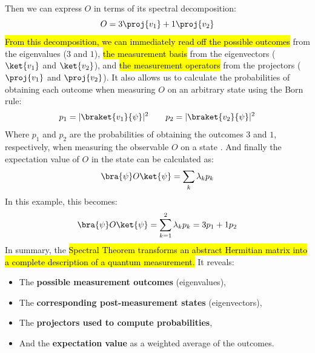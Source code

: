 Then we can express $O$ in terms of its spectral decomposition:
\begin{equation*}
    O = 3 \proj{v_1} + 1 \proj{v_2}
\end{equation*}
\hl{From this decomposition, we can immediately read off the possible outcomes} from the eigenvalues ($3$ and $1$), \hl{the measurement basis} from the eigenvectors ($\ket{v_1}$ and $\ket{v_2}$), and \hl{the measurement operators} from the projectors ($\proj{v_1}$ and $\proj{v_2}$). It also allows us to calculate the probabilities of obtaining each outcome when measuring $O$ on an arbitrary state \ket{\psi} using the Born rule:
\begin{equation*}
    p_1 = |\braket{v_1}{\psi}|^2
    \qquad
    p_2 = |\braket{v_2}{\psi}|^2
\end{equation*}
Where $p_1$ and $p_2$ are the probabilities of obtaining the outcomes $3$ and $1$, respectively, when measuring the observable $O$ on a state \ket{\psi}. And finally the expectation value of $O$ in the state \ket{\psi} can be calculated as:
\begin{equation*}
    \bra{\psi} O \ket{\psi} = \sum_k \lambda_k p_k
\end{equation*}
In this example, this becomes:
\begin{equation*}
    \bra{\psi} O \ket{\psi} = \sum_{k=1}^2 \lambda_k p_k = 3p_1 + 1p_2
\end{equation*}
In summary, the \hl{Spectral Theorem transforms an abstract Hermitian matrix into a complete description of a quantum measurement.} It reveals:
\begin{itemize}
    \item The \textbf{possible measurement outcomes} (eigenvalues),
    \item The \textbf{corresponding post-measurement states} (eigenvectors),
    \item The \textbf{projectors used to compute probabilities},
    \item And the \textbf{expectation value} as a weighted average of the outcomes.
\end{itemize}